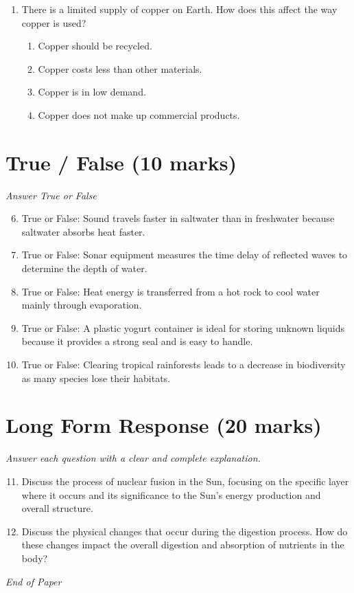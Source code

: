 \documentclass[12pt]{article}
\begin{document}
\begin{enumerate}[label=\arabic*.]
\begin{enumerate}[label=(\alph*)]
    \item NaCL + OH
    \item NaOH + Cl
    \item NaCl + H\_\{2\}O
\end{enumerate}
\item There is a limited supply of copper on Earth. How does this affect the way copper is used?
\begin{enumerate}[label=(\alph*)]
    \item Copper should be recycled.
    \item Copper costs less than other materials.
    \item Copper is in low demand.
    \item Copper does not make up commercial products.
\end{enumerate}
\end{enumerate}

\section*{True / False (10 marks)}
\textit{Answer True or False}
\begin{enumerate}[label=\arabic*.]
\setcounter{enumi}{5}
\item True or False: Sound travels faster in saltwater than in freshwater because saltwater absorbs heat faster.
\item True or False: Sonar equipment measures the time delay of reflected waves to determine the depth of water.
\item True or False: Heat energy is transferred from a hot rock to cool water mainly through evaporation.
\item True or False: A plastic yogurt container is ideal for storing unknown liquids because it provides a strong seal and is easy to handle.
\item True or False: Clearing tropical rainforests leads to a decrease in biodiversity as many species lose their habitats.
\end{enumerate}

\section*{Long Form Response (20 marks)}
\textit{Answer each question with a clear and complete explanation.}
\begin{enumerate}[label=\arabic*.]
\setcounter{enumi}{10}
\item Discuss the process of nuclear fusion in the Sun, focusing on the specific layer where it
occurs and its significance to the Sun's energy production and overall structure.
\item Discuss the physical changes that occur during the digestion process. How do these changes
impact the overall digestion and absorption of nutrients in the body?
\end{enumerate}

\vfill
\noindent\textit{End of Paper}
\end{document}
